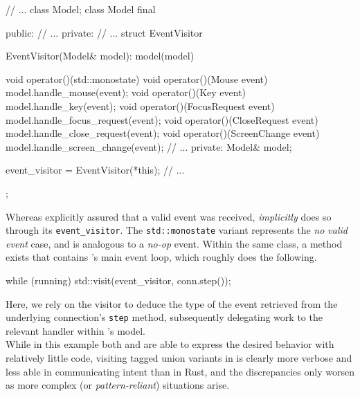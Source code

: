 \begin{cppblock}
  // ...
  class Model;
  class Model final
  {
  public:
    // ...
  private:
    // ...
    struct EventVisitor
    {
      EventVisitor(Model& model): model(model) {}

      void operator()(std::monostate) {}
      void operator()(Mouse event) {
        model.handle_mouse(event);
      }
      void operator()(Key event) {
        model.handle_key(event);
      }
      void operator()(FocusRequest event) {
        model.handle_focus_request(event);
      }
      void operator()(CloseRequest event) {
        model.handle_close_request(event);
      }
      void operator()(ScreenChange event) {
        model.handle_screen_change(event);
      }
      // ...
    private:
      Model& model;
    } event_visitor = EventVisitor(*this);
    // ...
  };
\end{cppblock}

Whereas  \wmrs  explicitly assured  that  a  valid  event was  received,  \wmcpp
\textit{implicitly}  does so  through  its \texttt{event_visitor}.  The
\texttt{std::monostate} variant represents  the \textit{no valid event}
case,  and is  analogous to  a \textit{no-op}  event. Within  the same  class, a
method exists that contains \mbox{\wmcpp}'s  main event loop, which roughly does
the following.

\begin{cppblock}
  while (running)
    std::visit(event_visitor, conn.step());
\end{cppblock}

Here, we rely on the visitor to deduce  the type of the event retrieved from the
underlying connection's  \texttt{step} method,  subsequently delegating
work to the relevant handler within \wmcpp's model.\\

While in  this example  both \wmrs and  \wmcpp are able  to express  the desired
behavior with relatively little code, visiting  tagged union variants in \cpp is
clearly more  verbose and less  able in communicating  intent than in  Rust, and
the  discrepancies only  worsen  as more  complex (or  \textit{pattern-reliant})
situations arise\cite{stdvisitwrong}.
